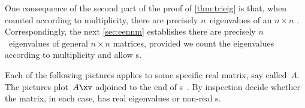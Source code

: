 One consequence of the second part of the proof of \cref{thm:trieig} is that, when counted according to multiplicity, there are precisely \(n\)~eigenvalues of an \(n\times n\) .
Correspondingly, the next \cref{sec:eennm} establishes there are precisely \(n\)~eigenvalues of general \(n\times n\) matrices, provided we count the eigenvalues according to multiplicity and allow s.










\sectionExercises

\begin{exercise}  
Each of the following pictures applies to some specific real matrix, say called~\(A\).
The pictures plot~\(A\xv\) adjoined to the end of s~\xv.
By inspection decide whether the matrix, in each case, has real eigenvalues or non-real s.

\begin{Parts}
\begin{reduce}
\item {}

\item {}

\item {}

\item {}
\end{reduce}

\item {}

\item {}

\item {}

\item {}

\end{Parts}
\end{exercise}








